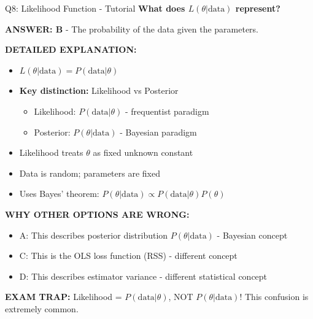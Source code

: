 \documentclass[8pt]{beamer}
\begin{document}
	\begin{frame}{Q8: Likelihood Function - Tutorial}
		\fontsize{6.5}{7.5}\selectfont
		\textbf{What does $L(\theta | \text{data})$ represent?}
		
		\vspace{0.05cm}
		\textcolor{myblue}{\textbf{ANSWER: B}} - The probability of the data given the parameters.
		
		\vspace{0.05cm}
		\textbf{DETAILED EXPLANATION:}
		\begin{itemize}
			\item $L(\theta | \text{data}) = P(\text{data} | \theta)$
			\item \textbf{Key distinction:} Likelihood vs Posterior
			\begin{itemize}
				\item Likelihood: $P(\text{data} | \theta)$ - frequentist paradigm
				\item Posterior: $P(\theta | \text{data})$ - Bayesian paradigm
			\end{itemize}
			\item Likelihood treats $\theta$ as fixed unknown constant
			\item Data is random; parameters are fixed
			\item Uses Bayes' theorem: $P(\theta | \text{data}) \propto P(\text{data} | \theta) P(\theta)$
		\end{itemize}
		
		\vspace{0.05cm}
		\textcolor{myred}{\textbf{WHY OTHER OPTIONS ARE WRONG:}}
		\begin{itemize}
			\item \textcolor{myred}{A:} This describes posterior distribution $P(\theta|\text{data})$ - Bayesian concept
			\item \textcolor{myred}{C:} This is the OLS loss function (RSS) - different concept
			\item \textcolor{myred}{D:} This describes estimator variance - different statistical concept
		\end{itemize}
		
		\textcolor{myred}{\textbf{EXAM TRAP:}} Likelihood = $P(\text{data} | \theta)$, NOT $P(\theta | \text{data})$! This confusion is extremely common.
	\end{frame}
	
\end{document}
